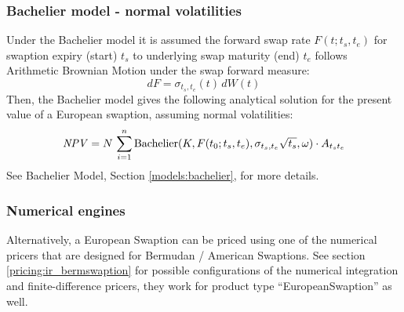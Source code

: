 \subsubsection*{Bachelier model - normal volatilities}

Under the Bachelier model it is assumed the forward swap rate $F(t; t_s, t_e)$  
for swaption expiry (start) $t_s$ to underlying swap maturity (end) $t_e$ follows 
Arithmetic Brownian Motion under the swap forward measure:
$$
dF=\sigma_{t_s,t_e}(t)\,dW(t)
$$
Then, the Bachelier model gives the following analytical solution for the 
present value of a European swaption, assuming normal volatilities:
$$
\mathit{NPV}=N\,\sum_{i=1}^n\mbox{Bachelier}(K,F(t_0; t_s, t_e),\sigma_{t_s,t_e}\sqrt{t_s},\omega)\cdot A_{t_s t_e}
$$
See Bachelier Model, Section \ref{models:bachelier}, for more details.

\subsubsection*{Numerical engines}

Alternatively, a European Swaption can be priced using one of the numerical pricers that are designed for Bermudan /
American Swaptions. See section \ref{pricing:ir_bermswaption} for possible configurations of the numerical integration
and finite-difference pricers, they work for product type ``EuropeanSwaption'' as well.
